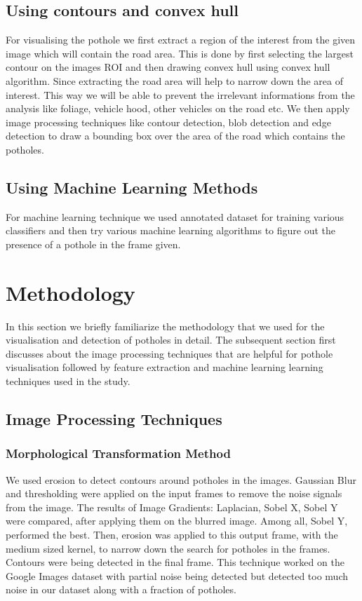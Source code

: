 \documentclass[journal]{IEEEtran}
\begin{document}
\subsection{Using contours and convex hull}

For visualising the pothole we first extract a region of the interest from the given image which will contain the road area. This is done by first selecting the largest contour on the images ROI and then drawing convex hull using convex hull algorithm. Since extracting the road area will help to narrow down the area of interest. This way we will be able to prevent the irrelevant informations from the analysis like foliage, vehicle hood, other vehicles on the road etc. We then apply image processing techniques like contour detection, blob detection and edge detection to draw a bounding box over the area of the road which contains the potholes.

\subsection{Using Machine Learning Methods}
For machine learning technique we used annotated dataset \cite{dataset} for training various classifiers and then try various machine learning algorithms to figure out the presence of a pothole in the frame given.

\section{Methodology}

In this section we briefly familiarize the methodology that we used for the visualisation and detection of potholes in detail. The subsequent section first discusses about the image processing techniques that are helpful for pothole visualisation followed by feature extraction and machine learning learning techniques  used in the study.

\subsection{Image Processing Techniques}

\subsubsection{Morphological Transformation Method}
We used erosion to detect contours around potholes in the images. Gaussian Blur and thresholding were applied on the input frames to remove the noise signals from the image. The results of Image Gradients: Laplacian, Sobel X, Sobel Y were compared, after applying them on the blurred image. Among all, Sobel Y, performed the best. Then, erosion was applied to this output frame, with the medium sized kernel, to narrow down the search for potholes in the frames. Contours were being detected in the final frame. This technique worked on the Google Images dataset with partial noise being detected but detected too much noise in our dataset along with a fraction of potholes.
\end{document}
